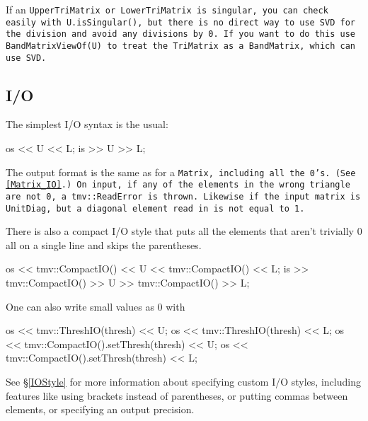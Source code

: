 If an \tt{UpperTriMatrix} or \tt{LowerTriMatrix} is singular, 
you can check easily with \tt{U.isSingular()},
but there is no direct way to use SVD for the division and avoid any
divisions by 0.  If you want to do this use \tt{BandMatrixViewOf(U)} to 
treat the \tt{TriMatrix} as a \tt{BandMatrix}, which can use SVD.

\subsection{I/O}
\label{TriMatrix_IO}

The simplest I/O syntax is the usual:
\begin{tmvcode}
os << U << L;
is >> U >> L;
\end{tmvcode}
The output format is the same as for a \tt{Matrix}, including all the 0's.
(See \ref{Matrix_IO}.)  On input, if any of the elements in the wrong triangle 
are not 0, a \tt{tmv::ReadError} is thrown.  Likewise if the input matrix is
\tt{UnitDiag}, but a diagonal element read in is not equal to 1.

There is also a compact I/O style that puts all the elements that aren't trivially 0 all on a single line and skips the parentheses. 
\begin{tmvcode}
os << tmv::CompactIO() << U << tmv::CompactIO() << L;
is >> tmv::CompactIO() >> U >> tmv::CompactIO() >> L;
\end{tmvcode}

One can also write small values as 0 with
\begin{tmvcode}
os << tmv::ThreshIO(thresh) << U;
os << tmv::ThreshIO(thresh) << L;
os << tmv::CompactIO().setThresh(thresh) << U;
os << tmv::CompactIO().setThresh(thresh) << L;
\end{tmvcode}

See \S\ref{IOStyle} for more information about specifying custom I/O styles, including
features like using brackets instead of parentheses, or putting commas between elements,
or specifying an output precision.  

